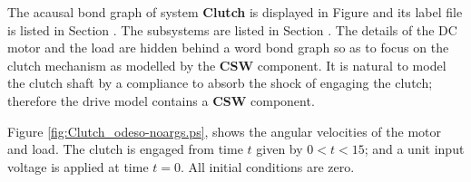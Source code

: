 

   The acausal bond graph of system \textbf{Clutch} is displayed in
   Figure  and its label file is listed in Section
   .  The subsystems are listed in Section
   .  The details of the DC motor and the load are
   hidden behind a word bond graph so as to focus on the clutch
   mechanism as modelled by the \textbf{CSW} component.
  It is natural to model the clutch shaft by a
compliance to absorb the shock of engaging the clutch; therefore the
drive model contains a \textbf{CSW} component.


Figure \ref{fig:Clutch_odeso-noargs.ps}, shows the angular velocities of the motor
and load.  The clutch is engaged from time $t$ given by $0<t<15$; and
a unit input voltage is applied at time $t=0$. All initial conditions
are zero.
